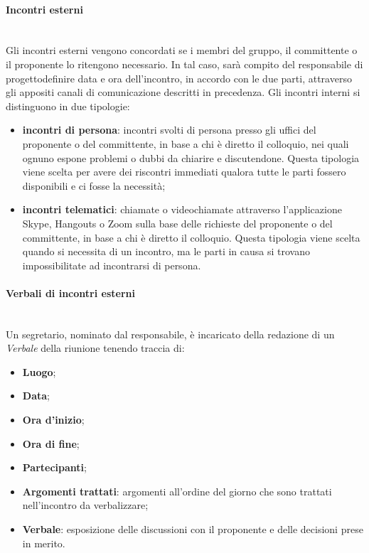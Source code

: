 			\paragraph*{Incontri esterni}\mbox{}\\ [1mm]
				Gli incontri esterni vengono concordati se i membri del gruppo, il committente o il proponente lo ritengono necessario. In tal caso, sarà compito del responsabile di progetto\glosp definire data e ora dell'incontro, in accordo con le due parti, attraverso gli appositi canali di comunicazione descritti in precedenza.
				Gli incontri interni si distinguono in due tipologie:
				\begin{itemize}
					\item \textbf{incontri di persona}: incontri svolti di persona presso gli uffici del proponente o del committente, in base a chi è diretto il colloquio, nei quali ognuno espone problemi o dubbi da chiarire e discutendone. Questa tipologia viene scelta per avere dei riscontri immediati qualora tutte le parti fossero disponibili e ci fosse la necessità;
					\item \textbf{incontri telematici}: chiamate o videochiamate attraverso l'applicazione Skype, Hangouts o Zoom sulla base delle richieste del proponente o del committente, in base a chi è diretto il colloquio. Questa tipologia viene scelta quando si necessita di un incontro, ma le parti in causa si trovano impossibilitate ad incontrarsi di persona. 
				\end{itemize}
			\paragraph*{Verbali di incontri esterni}\mbox{}\\ [1mm]
				Un segretario, nominato dal responsabile, è incaricato della redazione di un \textit{Verbale} della riunione tenendo traccia di:
				\begin{itemize}
					\item \textbf{Luogo};
					\item \textbf{Data};
					\item \textbf{Ora d'inizio};
					\item \textbf{Ora di fine};
					\item \textbf{Partecipanti};
					\item \textbf{Argomenti trattati}: argomenti all'ordine del giorno che sono trattati nell'incontro da verbalizzare;
					\item \textbf{Verbale}: esposizione delle discussioni con il proponente e delle decisioni prese in merito.
				\end{itemize}
